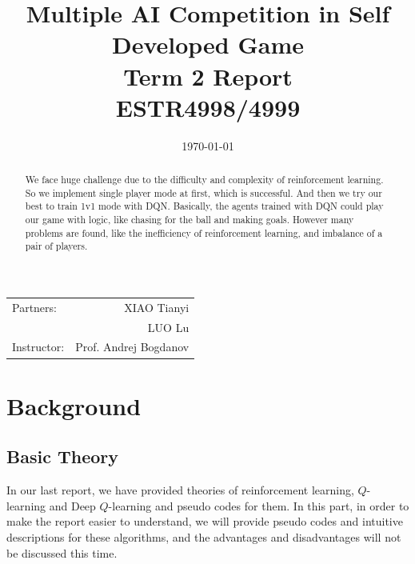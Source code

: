 \documentclass[12pt]{article}
\title{\large Multiple AI Competition in Self Developed Game \\ Term 2 Report \\ ESTR4998/4999} %
\date{\today} %
\begin{document}
\maketitle %

\begin{center}
\begin{tabular}{l r}
Partners: & XIAO Tianyi \\ %
& LUO Lu \\
Instructor: & Prof. Andrej Bogdanov %
\end{tabular}
\end{center}
\newpage



\begin{abstract}
	We face huge challenge due to the difficulty and complexity of reinforcement learning. So we implement single player mode at first, which is successful. And then we try our best to train 1v1 mode with DQN. Basically, the agents trained with DQN could play our game with logic, like chasing for the ball and making goals. However many problems are found, like the inefficiency of reinforcement learning, and imbalance of a pair of players.
\end{abstract}
 
\section{Background}

\subsection{Basic Theory}
In our last report, we have provided theories of reinforcement learning, $Q$-learning and Deep $Q$-learning and pseudo codes for them. In this part, in order to make the report easier to understand, we will provide pseudo codes and intuitive descriptions for these algorithms, and the advantages and disadvantages will not be discussed this time.
\end{document}
